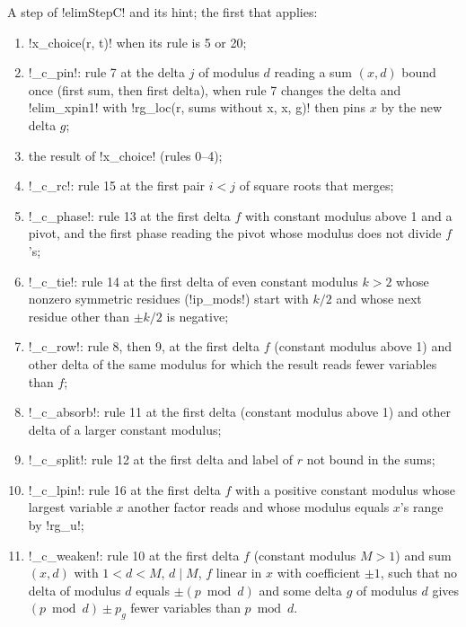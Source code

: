 {{{\begin{algorithm}\label{alg:lean-export-sym-cchoice}
A step of \lexlean!elimStepC! and its hint; the first that applies:
\begin{enumerate}
\item \lexpy!x_choice(r, t)! when its rule is 5 or 20;
\item \lexpy!_c_pin!: rule 7 at the delta $j$ of modulus $d$ reading a sum $(x, d)$ bound once
(first sum, then first delta), when rule 7 changes the delta and \lexpy!elim_xpin1! with
\lexpy!rg_loc(r, sums without x, x, g)! then pins $x$ by the new delta $g$;
\item the result of \lexpy!x_choice! (rules 0--4);
\item \lexpy!_c_rc!: rule 15 at the first pair $i<j$ of square roots that merges;
\item \lexpy!_c_phase!: rule 13 at the first delta $f$ with constant modulus above 1 and a pivot,
and the first phase reading the pivot whose modulus does not divide $f$'s;
\item \lexpy!_c_tie!: rule 14 at the first delta of even constant modulus $k>2$ whose nonzero
symmetric residues (\lexpy!ip_mods!) start with $k/2$ and whose next residue other than $\pm k/2$
is negative;
\item \lexpy!_c_row!: rule 8, then 9, at the first delta $f$ (constant modulus above 1) and other
delta of the same modulus for which the result reads fewer variables than $f$;
\item \lexpy!_c_absorb!: rule 11 at the first delta (constant modulus above 1) and other delta of a
larger constant modulus;
\item \lexpy!_c_split!: rule 12 at the first delta and label of $r$ not bound in the sums;
\item \lexpy!_c_lpin!: rule 16 at the first delta $f$ with a positive constant modulus whose
largest variable $x$ another factor reads and whose modulus equals $x$'s range by
\lexpy!rg_u!;
\item \lexpy!_c_weaken!: rule 10 at the first delta $f$ (constant modulus $M>1$) and sum $(x, d)$
with $1<d<M$, $d\mid M$, $f$ linear in $x$ with coefficient $\pm1$, such that no delta of
modulus $d$ equals $\pm(p \bmod d)$ and some delta $g$ of modulus $d$ gives
$(p \bmod d) \pm p_g$ fewer variables than $p \bmod d$.
\end{enumerate}
\end{algorithm}

}}}
